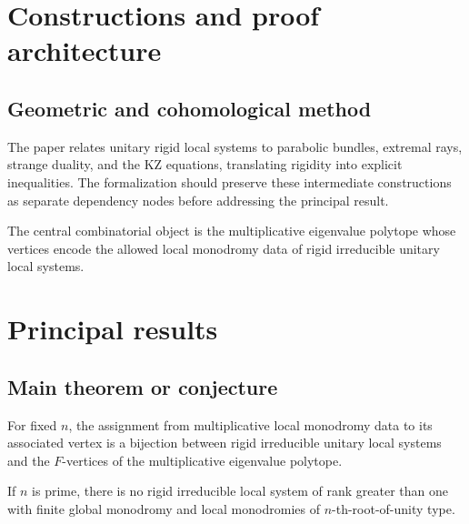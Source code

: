 \chapter{Constructions and proof architecture}
\label{chap:rigid-local-systems-multiplicative-eigenvalue-problem-method}

\section{Geometric and cohomological method}
\label{sec:rigid-local-systems-multiplicative-eigenvalue-problem-method}

The paper relates unitary rigid local systems to parabolic bundles, extremal rays, strange duality, and the KZ equations, translating rigidity into explicit inequalities. The formalization should preserve these intermediate constructions
as separate dependency nodes before addressing the principal result.

\begin{definition}
\label{rigid-local-systems-multiplicative-eigenvalue-problem-central-object}
The central combinatorial object is the multiplicative eigenvalue polytope whose vertices encode the allowed local monodromy data of rigid irreducible unitary local systems.
\notready
\end{definition}

\chapter{Principal results}
\label{chap:rigid-local-systems-multiplicative-eigenvalue-problem-results}

\section{Main theorem or conjecture}
\label{sec:rigid-local-systems-multiplicative-eigenvalue-problem-results}

\begin{theorem}
\label{rigid-local-systems-multiplicative-eigenvalue-problem-main}
For fixed $n$, the assignment from multiplicative local monodromy data to its associated vertex is a bijection between rigid irreducible unitary local systems and the $F$-vertices of the multiplicative eigenvalue polytope.
\notready
\end{theorem}

\begin{theorem}
\label{rigid-local-systems-multiplicative-eigenvalue-problem-secondary}
If $n$ is prime, there is no rigid irreducible local system of rank greater than one with finite global monodromy and local monodromies of $n$-th-root-of-unity type.
\notready
\end{theorem}
